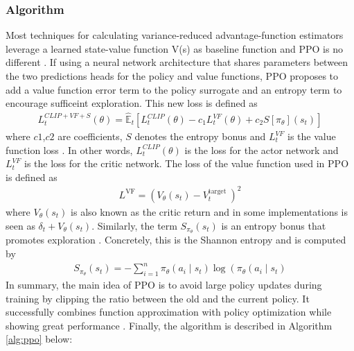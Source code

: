 \subsubsection{Algorithm}
Most techniques for calculating variance-reduced advantage-function estimators leverage a learned state-value function V(s) as baseline function and PPO is no different \cite{schulman2017proximal}. If using a neural network architecture that shares parameters between the two predictions heads for the policy and value functions, PPO proposes to add a value function error term to the policy surrogate and an entropy term to encourage sufficeint exploration. This new loss is defined as
\begin{gather}
    L_{t}^{C L I P+V F+S}(\theta)=\hat{\mathbb{E}}_{t}\left[L_{t}^{C L I P}(\theta)-c_{1} L_{t}^{V F}(\theta)+c_{2} S\left[\pi_{\theta}\right]\left(s_{t}\right)\right]
\end{gather}
where $c1$,$c2$ are coefficients, $S$ denotes the entropy bonus and $L_{t}^{V F}$ is the value function loss \cite{schulman2017proximal}. In other words, $L_{t}^{C L I P}(\theta)$ is the loss for the actor network and $L_{t}^{V F}$ is the loss for the critic network. The loss of the value function used in PPO is defined as
\begin{gather}
    L^{\mathrm{VF}}=\left(V_{\theta}\left(s_{t}\right)-V_{t}^{\text {target }}\right)^{2}
\end{gather}
where $V_{\theta}\left(s_{t}\right)$ is also known as the critic return and in some implementations is seen as $\delta_{t} + V_{\theta}\left(s_{t}\right)$. Similarly, the term $S_{\pi_{\theta}}\left(s_{t}\right)$ is an entropy bonus that promotes exploration \cite{schulman2017proximal}. Concretely, this is the Shannon entropy and is computed by
\begin{gather}
    S_{\pi_{\theta}}\left(s_{t}\right)=-\sum_{i=1}^{n} \pi_{\theta}\left(a_{i} \mid s_{t}\right) \log \left(\pi_{\theta}\left(a_{i} \mid s_{t}\right)\right.
\end{gather}
In summary, the main idea of PPO is to avoid large policy updates during training by clipping the ratio between the old and the current policy. It successfully combines function approximation with policy optimization while showing great performance \cite{schulman2017proximal}. Finally, the algorithm is described in Algorithm \ref{alg:ppo} below:

